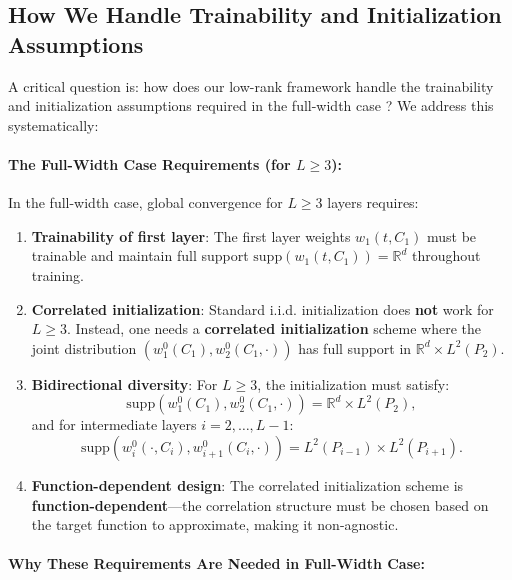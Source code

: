 \documentclass[11pt]{article}
\newcommand{\1}{\mathbbm{1}}
\begin{document}
\subsection{How We Handle Trainability and Initialization Assumptions}

A critical question is: how does our low-rank framework handle the trainability and initialization assumptions required in the full-width case \cite{nguyen2023rigorousframeworkmeanfield}? We address this systematically:

\paragraph*{The Full-Width Case Requirements (for $L \ge 3$):}

In the full-width case, global convergence for $L \ge 3$ layers requires:

\begin{enumerate}
\item \textbf{Trainability of first layer}: The first layer weights $w_1(t, C_1)$ must be trainable and maintain full support $\text{supp}(w_1(t, C_1)) = \mathbb{R}^d$ throughout training.

\item \textbf{Correlated initialization}: Standard i.i.d. initialization does \textbf{not} work for $L \ge 3$. Instead, one needs a \textbf{correlated initialization} scheme where the joint distribution $(w_1^0(C_1), w_2^0(C_1, \cdot))$ has full support in $\mathbb{R}^d \times L^2(P_2)$.

\item \textbf{Bidirectional diversity}: For $L \ge 3$, the initialization must satisfy:
\[
\text{supp}(w_1^0(C_1), w_2^0(C_1, \cdot)) = \mathbb{R}^d \times L^2(P_2),
\]
and for intermediate layers $i = 2, \ldots, L-1$:
\[
\text{supp}(w_i^0(\cdot, C_i), w_{i+1}^0(C_i, \cdot)) = L^2(P_{i-1}) \times L^2(P_{i+1}).
\]

\item \textbf{Function-dependent design}: The correlated initialization scheme is \textbf{function-dependent}---the correlation structure must be chosen based on the target function to approximate, making it non-agnostic.
\end{enumerate}

\paragraph*{Why These Requirements Are Needed in Full-Width Case:}
\end{document}
